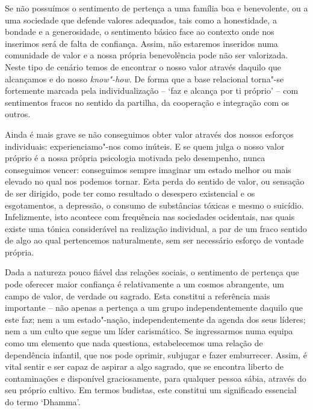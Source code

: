 Se não possuímos o sentimento de pertença a uma família boa e benevolente, ou a uma sociedade que defende valores adequados, tais como a honestidade, a bondade e a generosidade, o sentimento básico face ao contexto onde nos inserimos será de falta de confiança. Assim, não estaremos inseridos numa comunidade de valor e a nossa própria benevolência pode não ser valorizada. Neste tipo de cenário temos de encontrar o nosso valor através daquilo que alcançamos e do nosso \emph{know"-how}. De forma que a base relacional torna"-se fortemente marcada pela individualização -- `faz e alcança por ti próprio' -- com sentimentos fracos no sentido da partilha, da cooperação e integração com os outros.

Ainda é mais grave se não conseguimos obter valor através dos nossos esforços individuais: experienciamo"-nos como inúteis. E se quem julga o nosso valor próprio é a nossa própria psicologia motivada pelo desempenho, nunca conseguimos vencer: conseguimos sempre imaginar um estado melhor ou mais elevado no qual nos podemos tornar. Esta perda do sentido de valor, ou sensação de ser dirigido, pode ter como resultado o desespero existencial e os esgotamentos, a depressão, o consumo de substâncias tóxicas e mesmo o suicídio. Infelizmente, isto acontece com frequência nas sociedades ocidentais, nas quais existe uma tónica considerável na realização individual, a par de um fraco sentido de algo ao qual pertencemos naturalmente, sem ser necessário esforço de vontade própria.

Dada a natureza pouco fiável das relações sociais, o sentimento de pertença que pode oferecer maior confiança é relativamente a um cosmos abrangente, um campo de valor, de verdade ou sagrado. Esta constitui a referência mais importante -- não apenas a pertença a um grupo independentemente daquilo que este faz; nem a um estado"-nação, independentemente da agenda dos seus líderes; nem a um culto que segue um líder carismático. Se ingressarmos numa equipa como um elemento que nada questiona, estabelecemos uma relação de dependência infantil, que nos pode oprimir, subjugar e fazer emburrecer. Assim, é vital sentir e ser capaz de aspirar a algo sagrado, que se encontra liberto de contaminações e disponível graciosamente, para qualquer pessoa sábia, através do seu próprio cultivo. Em termos budistas, este constitui um significado essencial do termo `Dhamma'.

